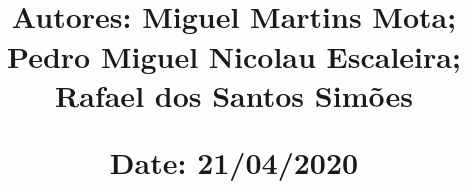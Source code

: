 \documentclass{article}
\begin{document}
\title{\vspace{-0.9cm}
       \large\raggedright\textbf{} \\ 
       \vspace{0.5cm}
       \normalsize
       \raggedright\textbf{Autores: \hspace{1.1cm} Miguel Martins Mota; Pedro Miguel Nicolau Escaleira; Rafael dos Santos Simões} \\ \vspace{0.4cm}
       \raggedright\textbf{Date: \hspace{1.45cm} 21/04/2020} \\}
\author{}
\date{}

\maketitle
\thispagestyle{fancy}

\vspace{-1.4cm}

\tableofcontents

\newpage

\fontsize{10pt}{13pt}
\selectfont
\lsstyle





\end{document}
